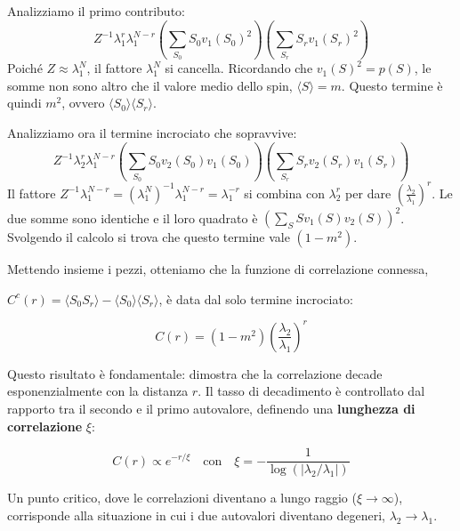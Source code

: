 Analizziamo il primo contributo:
\begin{equation}
Z^{-1} \lambda_1^r \lambda_1^{N-r} \left( \sum_{S_0} S_0 v_1(S_0)^2 \right) \left( \sum_{S_r} S_r v_1(S_r)^2 \right)
\end{equation}
Poiché $Z \approx \lambda_1^N$, il fattore $\lambda_1^N$ si cancella. Ricordando che $v_1(S)^2 = p(S)$, le somme non sono altro che il valore medio dello spin, $\langle S \rangle = m$. Questo termine è quindi $m^2$, ovvero $\langle S_0 \rangle \langle S_r \rangle$.

Analizziamo ora il termine incrociato che sopravvive:
\begin{equation}
Z^{-1} \lambda_2^r \lambda_1^{N-r} \left( \sum_{S_0} S_0 v_2(S_0) v_1(S_0) \right) \left( \sum_{S_r} S_r v_2(S_r) v_1(S_r) \right)
\end{equation}
Il fattore $Z^{-1} \lambda_1^{N-r} = (\lambda_1^N)^{-1} \lambda_1^{N-r} = \lambda_1^{-r}$ si combina con $\lambda_2^r$ per dare $(\frac{\lambda_2}{\lambda_1})^r$. Le due somme sono identiche e il loro quadrato è $(\sum_S S v_1(S) v_2(S))^2$. Svolgendo il calcolo si trova che questo termine vale $(1-m^2)$.

Mettendo insieme i pezzi, otteniamo che la funzione di correlazione connessa, 

$C^c(r)=\langle S_0 S_r \rangle - \langle S_0 \rangle \langle S_r \rangle$, è data dal solo termine incrociato:

\begin{equation}
C(r) = (1 - m^2) \left( \frac{\lambda_2}{\lambda_1} \right)^r
\end{equation}

Questo risultato è fondamentale: dimostra che la correlazione decade esponenzialmente con la distanza $r$. Il tasso di decadimento è controllato dal rapporto tra il secondo e il primo autovalore, definendo una \textbf{lunghezza di correlazione} $\xi$:

\begin{equation}
C(r) \propto e^{-r/\xi} \quad \text{con} \quad \xi = - \frac{1}{\log(|\lambda_2/\lambda_1|)}
\end{equation}

Un punto critico, dove le correlazioni diventano a lungo raggio ($\xi \to \infty$), corrisponde alla situazione in cui i due autovalori diventano degeneri, $\lambda_2 \to \lambda_1$.


